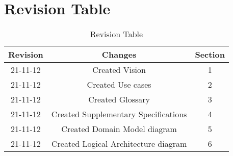 \documentclass[11pt,a4paper]{article}
\begin{document}
\section{Revision Table}
\begin{table}[h]
\caption{Revision Table}
\begin{center}
\begin{tabular}{c|c|c}
\hline 
Revision & Changes & Section \\ \hline 
21-11-12 & Created Vision & 1 \\ 
21-11-12 & Created Use cases & 2 \\
21-11-12 & Created Glossary & 3 \\
21-11-12 & Created Supplementary Specifications & 4 \\ 
21-11-12 & Created Domain Model diagram & 5 \\
21-11-12 & Created Logical Architecture diagram & 6 \\
\hline 
\end{tabular} 
\end{center}
\end{table}
	
\end{document}
